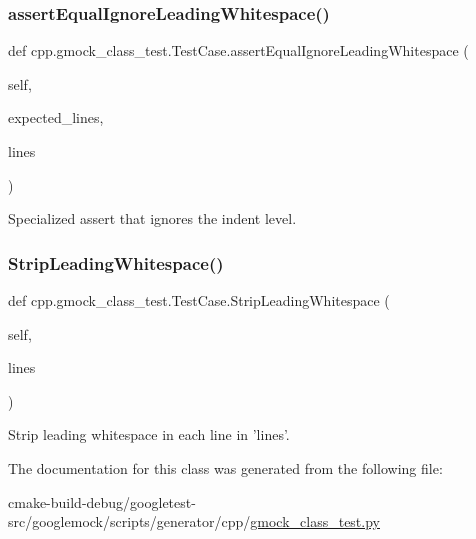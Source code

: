 \subsubsection{\texorpdfstring{assertEqualIgnoreLeadingWhitespace()}{assertEqualIgnoreLeadingWhitespace()}}
{\footnotesize\ttfamily def cpp.\+gmock\+\_\+class\+\_\+test.\+Test\+Case.\+assert\+Equal\+Ignore\+Leading\+Whitespace (\begin{DoxyParamCaption}\item[{}]{self,  }\item[{}]{expected\+\_\+lines,  }\item[{}]{lines }\end{DoxyParamCaption})}

\begin{DoxyVerb}Specialized assert that ignores the indent level.\end{DoxyVerb}
 \mbox{\label{classcpp_1_1gmock__class__test_1_1TestCase_a366b15717eebc41e397357868c5734c5}} 
\subsubsection{\texorpdfstring{StripLeadingWhitespace()}{StripLeadingWhitespace()}}
{\footnotesize\ttfamily def cpp.\+gmock\+\_\+class\+\_\+test.\+Test\+Case.\+Strip\+Leading\+Whitespace (\begin{DoxyParamCaption}\item[{}]{self,  }\item[{}]{lines }\end{DoxyParamCaption})}

\begin{DoxyVerb}Strip leading whitespace in each line in 'lines'.\end{DoxyVerb}
 

The documentation for this class was generated from the following file\+:\begin{DoxyCompactItemize}
\item 
cmake-\/build-\/debug/googletest-\/src/googlemock/scripts/generator/cpp/\mbox{\hyperlink{gmock__class__test_8py}{gmock\+\_\+class\+\_\+test.\+py}}\end{DoxyCompactItemize}

